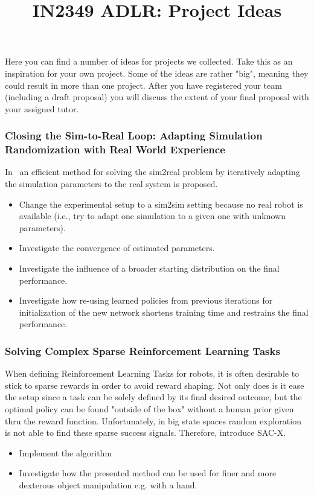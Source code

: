 \documentclass[a4paper]{article}
\title{IN2349 ADLR: Project Ideas}
\begin{document}
\maketitle

Here you can find a number of ideas for projects we collected. Take this as an inspiration for your own project. Some of the ideas are rather "big", meaning they could result in more than one project. After you have registered your team (including a draft proposal) you will discuss the extent of your final proposal with your assigned tutor.

\subsubsection{Closing the Sim-to-Real Loop: Adapting Simulation Randomization with Real World Experience}
In~\cite{Chebotar2018} an efficient method for solving the sim2real problem by iteratively adapting the simulation parameters to the real system is proposed.
\begin{itemize}
\item Change the experimental setup to a sim2sim setting because no real robot is available (i.e., try to adapt one simulation to a given one with unknown parameters).
\item Investigate the convergence of estimated parameters.
\item Investigate the influence of a broader starting distribution on the final performance.
\item Investigate how re-using learned policies from previous iterations for initialization of the new network shortens training time and restrains the final performance.
\end{itemize}

\subsubsection{Solving Complex Sparse Reinforcement Learning Tasks}
When defining Reinforcement Learning Tasks for robots, it is often desirable to stick to sparse rewards in order to avoid reward shaping. Not only does is it ease the setup since a task can be solely defined by its final desired outcome, but the optimal policy can be found "outside of the box" without a human prior given thru the reward function. Unfortunately, in big state spaces random exploration is not able to find these sparse success signals. Therefore, \cite{riedmiller2018} introduce SAC-X.
\begin{itemize}
\item Implement the algorithm
\item Investigate how the presented method can be used for finer and more dexterous object manipulation e.g. with a hand.
\end{itemize}
\end{document}
